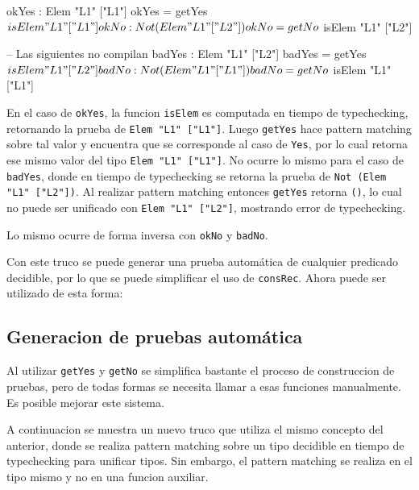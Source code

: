 \begin{code}
okYes : Elem "L1" ["L1"]
okYes = getYes $ isElem "L1" ["L1"]

okNo : Not (Elem "L1" ["L2"])
okNo = getNo $ isElem "L1" ["L2"]

-- Las siguientes no compilan
badYes : Elem "L1" ["L2"]
badYes = getYes $ isElem "L1" ["L2"]

badNo : Not (Elem "L1" ["L1"])
badNo = getNo $ isElem "L1" ["L1"]
\end{code}

En el caso de \texttt{okYes}, la funcion \texttt{isElem} es computada en tiempo de typechecking, retornando la prueba de \texttt{Elem "L1" ["L1"]}. Luego \texttt{getYes} hace pattern matching sobre tal valor y encuentra que se corresponde al caso de \texttt{Yes}, por lo cual retorna ese mismo valor del tipo \texttt{Elem "L1" ["L1"]}. No ocurre lo mismo para el caso de \texttt{badYes}, donde en tiempo de typechecking se retorna la prueba de \texttt{Not (Elem "L1" ["L2"])}. Al realizar pattern matching entonces \texttt{getYes} retorna \texttt{()}, lo cual no puede ser unificado con \texttt{Elem "L1" ["L2"]}, mostrando error de typechecking.

Lo mismo ocurre de forma inversa con \texttt{okNo} y \texttt{badNo}.

Con este truco se puede generar una prueba automática de cualquier predicado decidible, por lo que se puede simplificar el uso de \texttt{consRec}.
Ahora puede ser utilizado de esta forma:


\subsection{Generacion de pruebas automática}

Al utilizar \texttt{getYes} y \texttt{getNo} se simplifica bastante el proceso de construccion de pruebas, pero de todas formas se necesita llamar a esas funciones manualmente. Es posible mejorar este sistema.

A continuacion se muestra un nuevo truco que utiliza el mismo concepto del anterior, donde se realiza pattern matching sobre un tipo decidible en tiempo de typechecking para unificar tipos. Sin embargo, el pattern matching se realiza en el tipo mismo y no en una funcion auxiliar.

